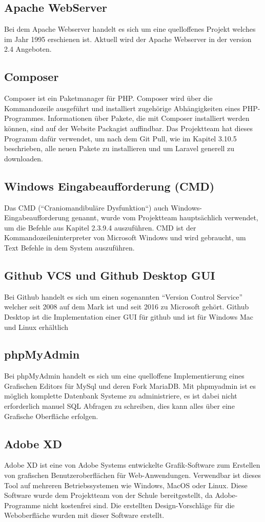 \subsection{Apache WebServer}
Bei dem Apache Webserver handelt es sich um eine quelloffenes Projekt welches im Jahr 1995 erschienen ist. Aktuell wird der Apache Webserver in der version 2.4 Angeboten.
\subsection{Composer}
Composer ist ein Paketmanager für PHP. Composer wird über die Kommandozeile ausgeführt und installiert zugehörige Abhängigkeiten eines PHP-Programmes. Informationen über Pakete, die mit Composer installiert werden können, sind auf der Website Packagist auffindbar. Das Projektteam hat dieses Programm dafür verwendet, um nach dem Git Pull, wie im Kapitel 3.10.5 beschrieben, alle neuen Pakete zu installieren und um Laravel generell zu downloaden.
\subsection{Windows Eingabeaufforderung (CMD)}
Das CMD (“Craniomandibuläre Dysfunktion“) auch Windows-Eingabeaufforderung genannt, wurde vom Projektteam hauptsächlich verwendet, um die Befehle aus Kapitel 2.3.9.4 auszuführen. CMD ist der Kommandozeileninterpreter von Microsoft Windows und wird gebraucht, um Text Befehle in dem System auszuführen. 
\subsection{Github VCS und Github Desktop GUI}
Bei Github handelt es sich um einen sogenannten “Version Control Service” welcher seit 2008 auf dem Mark ist und seit 2016 zu Microsoft gehört. Github Desktop ist die Implementation einer GUI für github und ist für Windows Mac und Linux erhältlich

\newpage
\subsection{ phpMyAdmin}
Bei phpMyAdmin handelt es sich um eine quelloffene Implementierung eines Grafischen Editors für MySql und deren Fork MariaDB. Mit phpmyadmin ist es möglich komplette Datenbank Systeme zu administriere, es ist dabei nicht erforderlich manuel SQL Abfragen zu schreiben, dies kann alles über eine Grafische Oberfläche erfolgen.  
\subsection{Adobe XD}
Adobe XD ist eine von Adobe Systems entwickelte Grafik-Software zum Erstellen von grafischen Benutzeroberflächen für Web-Anwendungen. Verwendbar ist dieses Tool auf mehreren Betriebssystemen wie Windows, MacOS oder Linux. Diese Software wurde dem Projektteam von der Schule bereitgestellt, da Adobe-Programme nicht kostenfrei sind. Die erstellten Design-Vorschläge für die Weboberfläche wurden mit dieser Software erstellt. 


